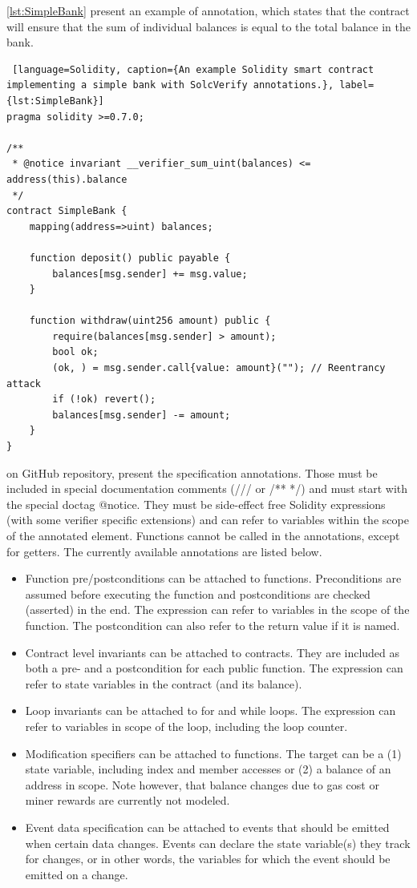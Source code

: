 \autoref{lst:SimpleBank} present an example of annotation, which states that the contract will ensure
that the sum of individual balances is equal to the total balance in the bank.


\begin{lstlisting} [language=Solidity, caption={An example Solidity smart contract implementing a simple bank with SolcVerify annotations.}, label={lst:SimpleBank}]
pragma solidity >=0.7.0;

/**
 * @notice invariant __verifier_sum_uint(balances) <= address(this).balance
 */
contract SimpleBank {
    mapping(address=>uint) balances;

    function deposit() public payable {
        balances[msg.sender] += msg.value;
    }

    function withdraw(uint256 amount) public {
        require(balances[msg.sender] > amount);
        bool ok;
        (ok, ) = msg.sender.call{value: amount}(""); // Reentrancy attack
        if (!ok) revert();
        balances[msg.sender] -= amount;
    }
}
\end{lstlisting}

\citet{SolcVerify_3} on GitHub repository, present the specification annotations. Those must be included in special documentation comments (/// or /** */) and must start with the special doctag @notice. 
They must be side-effect free Solidity expressions (with some verifier specific extensions) and can refer to variables within the scope of the annotated element. Functions cannot be called in the annotations, except for getters.
The currently available annotations are listed below. 

\begin{itemize}
    \item Function pre/postconditions can be attached to functions. Preconditions are assumed before executing the function and postconditions are checked (asserted) in the end. The expression can refer to variables in the scope of the function. The postcondition can also refer to the return value if it is named.
    \item Contract level invariants can be attached to contracts. They are included as both a pre- and a postcondition for each public function. The expression can refer to state variables in the contract (and its balance).
    \item Loop invariants can be attached to for and while loops. The expression can refer to variables in scope of the loop, including the loop counter.
    \item Modification specifiers can be attached to functions. The target can be a (1) state variable, including index and member accesses or (2) a balance of an address in scope. Note however, that balance changes due to gas cost or miner rewards are currently not modeled.
    \item Event data specification can be attached to events that should be emitted when certain data changes. 
    Events can declare the state variable(s) they track for changes, or in other words, the variables for which the event should be emitted on a change.
\end{itemize}

